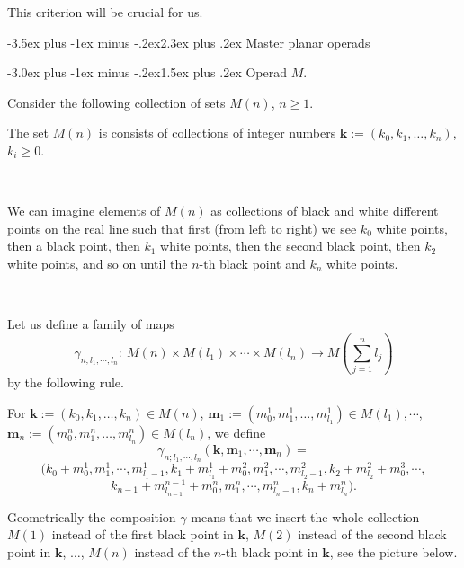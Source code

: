 \documentclass[12pt,a4paper]{article}
\makeatletter
\renewcommand{\section}{\@startsection{section}{1}{0pt}%
{-3.5ex plus -1ex minus -.2ex}{2.3ex plus .2ex}%
{\normalfont\Large}}
\renewcommand{\subsection}{\@startsection{subsection}{2}{0pt}%
{-3.0ex plus -1ex minus -.2ex}{-1.5ex plus .2ex}%
{\normalfont\large\bf}}
\renewcommand{\subsection}{\@startsection{subsection}{2}{0pt}%
{-3.0ex plus -1ex minus -.2ex}{1.5ex plus .2ex}%
{\normalfont\large\bf}}
\renewcommand{\section}{\@startsection{section}{1}{0pt}%
{-3.5ex plus -1ex minus -.2ex}{2.3ex plus .2ex}%
{\normalfont\Large}}
\renewcommand{\subsection}{\@startsection{subsection}{2}{0pt}%
{-3.0ex plus -1ex minus -.2ex}{-1.5ex plus .2ex}%
{\normalfont\normalsize\bf}}
\renewcommand{\subsection}{\@startsection{subsection}{2}{0pt}%
{-3.0ex plus -1ex minus -.2ex}{1.5ex plus .2ex}%
{\normalfont\normalsize\bf}}
\makeatother
\begin{document}
This criterion will be crucial for us.
  
   
 \section{Master planar operads}
 
 \subsection{Operad $M$.}
 
 Consider the following collection of sets $M(n)$, $n\ge 1$.
 
 The set $M(n)$ is consists of collections of integer numbers  $\mathbf k:=(k_0, k_1, \ldots, k_n)$, $k_i\ge 0$.
 
 \
 
 We can imagine elements of $M(n)$ as collections of black and white different points on the real line such that 
 first (from left to right) we see $k_0$ white points, then a black point, then $k_1$ white points, 
 then the second black point, then $k_2$ white points, and so on until the $n$-th black point and $k_n$ white points.
 
 \   
 
Let us define a family of maps   
\begin{equation}\label{master1}
\gamma_{n; l_1, \cdots, l_n}: \ M(n)\times M(l_1)\times \cdots\times M(l_n)\to M(\sum_{j=1}^n l_j)
\end{equation}
by the following  rule.

 For  $\mathbf k:=(k_0, k_1, \ldots, k_n)\in M(n)$,  $\mathbf m_1:=(m_0^1, m_1^1, \ldots, m_{l_1}^1)\in M(l_1),\cdots $, 
  $\mathbf m_n:=(m_0^n, m_1^n, \ldots, m_{l_n}^n) \in M(l_n)$, we define 
 \[
 \gamma_{n; l_1, \cdots, l_n}(\mathbf k, \mathbf m_1, \cdots, \mathbf m_n) =  
 \] 
\[
 (k_0+m_0^1, m_1^1, \cdots, m^1_{l_1-1},  k_1+m_{l_1}^1+m_0^2,  m_1^2, \cdots, m_{l_2-1}^2, k_2+m_{l_2}^2+m_0^3, \cdots,\]
  \begin{equation}\label{comp1}
  k_{n-1}+m_{l_{n-1}}^{n-1}+m_0^n,
 m_1^n, \cdots, m_{l_n-1}^n,  k_{n}+m_{l_{n}}^n).
 \end{equation}
 
 Geometrically the composition $\gamma$ means that we insert the whole collection $M(1)$ instead of the first black point in 
 $\mathbf k$, $M(2)$ instead of the second black point in 
 $\mathbf{k}$, $\ldots$, $M(n)$ instead of the $n$-th black point in $\mathbf{k}$, see the picture below.  
 
\end{document}
